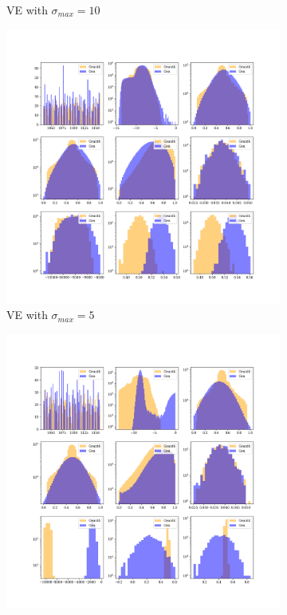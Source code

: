\begin{figure}[htbp]
\begin{subfigure}[b]{0.4\textwidth}
        \caption{VE with $\sigma_{max} = 10$}
        \label{fig:ve_10}
    \end{subfigure}
    
    \vspace{0.4em} %
    
    \begin{subfigure}[b]{0.4\textwidth}
        \includegraphics[width=\textwidth]{Figures/ve_5.png}
        \caption{VE with $\sigma_{max} = 5$}
        \label{fig:ve_5}
    \end{subfigure}
    \hspace{0.015\textwidth} %
    \begin{subfigure}[b]{0.4\textwidth}
        \includegraphics[width=\textwidth]{Figures/ve_1.png}

\end{subfigure}
\end{figure}
